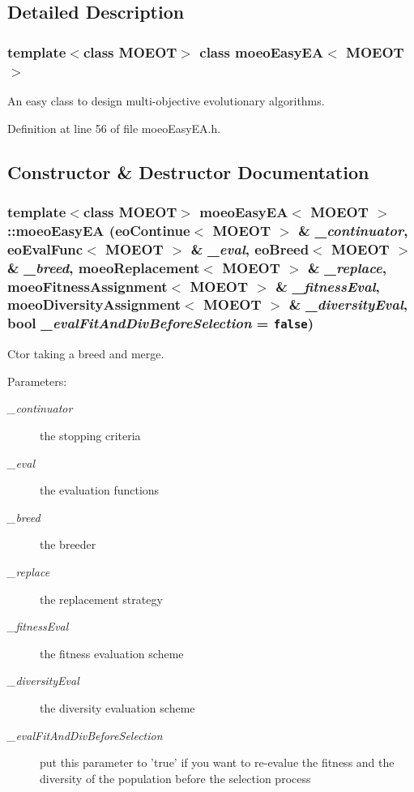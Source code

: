 \subsection{Detailed Description}
\subsubsection*{template$<$class MOEOT$>$ class moeo\-Easy\-EA$<$ MOEOT $>$}

An easy class to design multi-objective evolutionary algorithms. 



Definition at line 56 of file moeo\-Easy\-EA.h.

\subsection{Constructor \& Destructor Documentation}
\subsubsection{\setlength{\rightskip}{0pt plus 5cm}template$<$class MOEOT$>$ \bf{moeo\-Easy\-EA}$<$ MOEOT $>$::\bf{moeo\-Easy\-EA} (\bf{eo\-Continue}$<$ MOEOT $>$ \& {\em \_\-continuator}, \bf{eo\-Eval\-Func}$<$ MOEOT $>$ \& {\em \_\-eval}, \bf{eo\-Breed}$<$ MOEOT $>$ \& {\em \_\-breed}, \bf{moeo\-Replacement}$<$ MOEOT $>$ \& {\em \_\-replace}, \bf{moeo\-Fitness\-Assignment}$<$ MOEOT $>$ \& {\em \_\-fitness\-Eval}, \bf{moeo\-Diversity\-Assignment}$<$ MOEOT $>$ \& {\em \_\-diversity\-Eval}, bool {\em \_\-eval\-Fit\-And\-Div\-Before\-Selection} = {\tt false})\hspace{0.3cm}{\tt  [inline]}}\label{classmoeoEasyEA_3f657699b8ed340ae3f51194206daa20}


Ctor taking a breed and merge. 

\begin{Desc}
\item[Parameters:]
\begin{description}
\item[{\em \_\-continuator}]the stopping criteria \item[{\em \_\-eval}]the evaluation functions \item[{\em \_\-breed}]the breeder \item[{\em \_\-replace}]the replacement strategy \item[{\em \_\-fitness\-Eval}]the fitness evaluation scheme \item[{\em \_\-diversity\-Eval}]the diversity evaluation scheme \item[{\em \_\-eval\-Fit\-And\-Div\-Before\-Selection}]put this parameter to 'true' if you want to re-evalue the fitness and the diversity of the population before the selection process \end{description}
\end{Desc}


